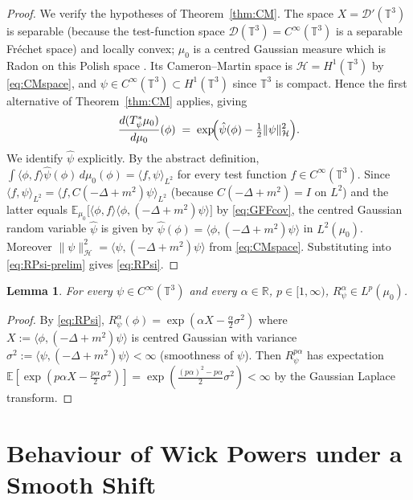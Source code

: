 \documentclass[12pt]{article}
\newtheorem{lemma}[theorem]{Lemma}
\theoremstyle{definition}
\begin{document}
\begin{proof}
We verify the hypotheses of Theorem~\ref{thm:CM}. The space $X=\mathcal{D}'(\mathbb{T}^3)$
is separable (because the test-function space $\mathcal{D}(\mathbb{T}^3)=C^\infty(\mathbb{T}^3)$
is a separable Fr\'echet space) and locally convex; $\mu_0$ is a centred Gaussian measure
which is Radon on this Polish space \cite[II.5]{Bogachev}. Its Cameron--Martin space is
$\mathcal{H}=H^1(\mathbb{T}^3)$ by \eqref{eq:CMspace}, and $\psi\in
C^\infty(\mathbb{T}^3)\subset H^1(\mathbb{T}^3)$ since $\mathbb{T}^3$ is compact. Hence the
first alternative of Theorem~\ref{thm:CM} applies, giving
\begin{equation}\label{eq:RPsi-prelim}
\frac{d(T_\psi^*\mu_0)}{d\mu_0}(\phi) \;=\; \exp\!\Bigl(\hat\psi(\phi) - \tfrac12\|\psi\|_{\mathcal{H}}^2\Bigr).
\end{equation}
We identify $\hat\psi$ explicitly. By the abstract definition,
$\int\langle\phi,f\rangle\hat\psi(\phi)\,d\mu_0(\phi)=\langle f,\psi\rangle_{L^2}$ for every
test function $f\in C^\infty(\mathbb{T}^3)$. Since
$\langle f,\psi\rangle_{L^2}=\langle f,C(-\Delta+m^2)\psi\rangle_{L^2}$ (because
$C(-\Delta+m^2)=I$ on $L^2$) and the latter equals
$\mathbb{E}_{\mu_0}\!\bigl[\langle\phi,f\rangle\langle\phi,(-\Delta+m^2)\psi\rangle\bigr]$ by
\eqref{eq:GFFcov}, the centred Gaussian random variable $\hat\psi$ is given by
$\hat\psi(\phi)=\langle\phi,(-\Delta+m^2)\psi\rangle$ in $L^2(\mu_0)$. Moreover
$\|\psi\|_{\mathcal{H}}^2=\langle\psi,(-\Delta+m^2)\psi\rangle$ from \eqref{eq:CMspace}.
Substituting into \eqref{eq:RPsi-prelim} gives \eqref{eq:RPsi}.
\end{proof}

\begin{lemma}\label{lem:Lp-Rpsi}
For every $\psi\in C^\infty(\mathbb{T}^3)$ and every $\alpha\in\mathbb{R}$, $p\in[1,\infty)$,
$R_\psi^\alpha\in L^p(\mu_0)$.
\end{lemma}

\begin{proof}
By \eqref{eq:RPsi}, $R_\psi^\alpha(\phi)=\exp(\alpha X-\tfrac{\alpha}{2}\sigma^2)$ where
$X:=\langle\phi,(-\Delta+m^2)\psi\rangle$ is centred Gaussian with variance
$\sigma^2:=\langle\psi,(-\Delta+m^2)\psi\rangle<\infty$ (smoothness of $\psi$). Then
$R_\psi^{p\alpha}$ has expectation
$\mathbb{E}[\exp(p\alpha X-\tfrac{p\alpha}{2}\sigma^2)]=\exp(\tfrac{(p\alpha)^2-p\alpha}{2}\sigma^2)<\infty$
by the Gaussian Laplace transform.
\end{proof}

\section{Behaviour of Wick Powers under a Smooth Shift}
\end{document}
